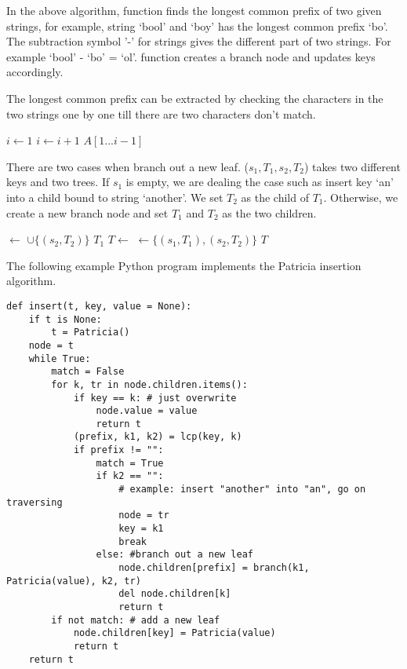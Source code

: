 \documentclass[UTF8]{article}
\begin{document}
In the above algorithm,  function finds the longest
common prefix of two given strings, for example, string `bool' and `boy'
has the longest common prefix `bo'. The subtraction symbol '-' for
strings gives the different part of two strings. For example `bool' - `bo' = `ol'.  function creates a branch node
and updates keys accordingly.

The longest common prefix can be extracted by checking the characters in the two
strings one by one till there are two characters don't match.

\begin{algorithmic}[1]
  \State $i \gets 1 $
    \State $i \gets i + 1$
  \EndWhile
  \State \Return $A[1...i-1]$
\EndFunction
\end{algorithmic}

There are two cases when branch out a new leaf. ($s_1, T_1, s_2, T_2$)
takes two different keys and two trees. If $s_1$ is empty, we are
dealing the case such as insert key `an' into a child bound to
string `another'. We set $T_2$ as the child of $T_1$. Otherwise,
we create a new branch node and set $T_1$ and $T_2$ as the two children.

\begin{algorithmic}[1]
    \State {} $\gets$  $\cup \{(s_2, T_2)\}$
    \State \Return $T_1$
  \EndIf
  \State $T \gets$ 
  \State {} $\gets \{(s_1, T_1), (s_2, T_2)\}$
  \State \Return $T$
\EndFunction
\end{algorithmic}

The following example Python program implements the Patricia insertion algorithm.

\lstset{language=Python}
\begin{lstlisting}
def insert(t, key, value = None):
    if t is None:
        t = Patricia()
    node = t
    while True:
        match = False
        for k, tr in node.children.items():
            if key == k: # just overwrite
                node.value = value
                return t
            (prefix, k1, k2) = lcp(key, k)
            if prefix != "":
                match = True
                if k2 == "":
                    # example: insert "another" into "an", go on traversing
                    node = tr
                    key = k1
                    break
                else: #branch out a new leaf
                    node.children[prefix] = branch(k1, Patricia(value), k2, tr)
                    del node.children[k]
                    return t
        if not match: # add a new leaf
            node.children[key] = Patricia(value)
            return t
    return t
\end{lstlisting}
\end{document}
